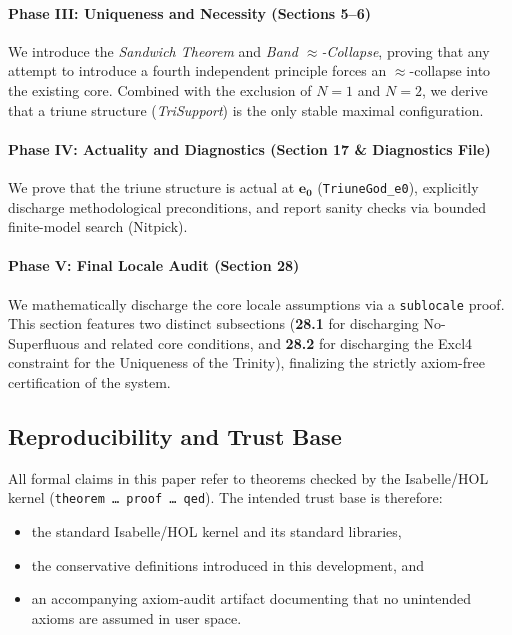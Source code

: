 \documentclass[a4paper, 11pt]{article}
\theoremstyle{plain}
\theoremstyle{definition}
\newcommand{\eZero}{\mathbf{e_0}}         %
\begin{document}
\paragraph{Phase III: Uniqueness and Necessity (Sections 5--6)} We introduce the \textit{Sandwich Theorem} and \textit{Band $\approx$-Collapse}, proving that any attempt to introduce a fourth independent principle forces an $\approx$-collapse into the existing core. Combined with the exclusion of $N=1$ and $N=2$, we derive that a triune structure (\textit{TriSupport}) is the only stable maximal configuration.

\paragraph{Phase IV: Actuality and Diagnostics (Section 17 \& Diagnostics File)} We prove that the triune structure is actual at $\eZero$ (\texttt{TriuneGod\_e0}), explicitly discharge methodological preconditions, and report sanity checks via bounded finite-model search (Nitpick).

\paragraph{Phase V: Final Locale Audit (Section 28)} We mathematically discharge the core locale assumptions via a \texttt{sublocale} proof. This section features two distinct subsections (\textbf{28.1} for discharging No-Superfluous and related core conditions, and \textbf{28.2} for discharging the Excl4 constraint for the Uniqueness of the Trinity), finalizing the strictly axiom-free certification of the system.

\subsection{Reproducibility and Trust Base}
\label{subsec:repro}
All formal claims in this paper refer to theorems checked by the Isabelle/HOL kernel (\texttt{theorem \dots\ proof \dots\ qed}). The intended trust base is therefore:
\begin{itemize}
  \item the standard Isabelle/HOL kernel and its standard libraries,
  \item the conservative definitions introduced in this development, and
  \item an accompanying axiom-audit artifact documenting that no unintended axioms are assumed in user space.
\end{itemize}
\end{document}
